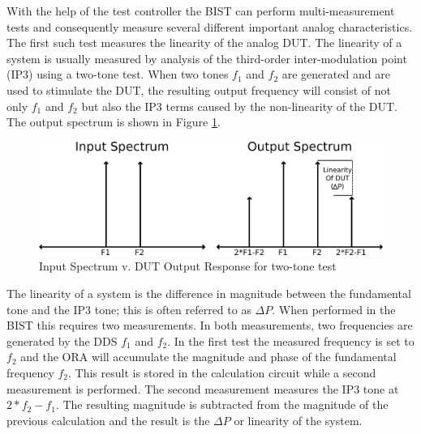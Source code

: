 \documentclass[12pt]{report}
\begin{document}
With the help of the test controller the BIST can perform multi-measurement tests and consequently measure several different important analog characteristics. The first such test measures the linearity of the analog DUT.  The linearity of a system is usually measured by analysis of the third-order inter-modulation point (IP3) using a two-tone test\cite{stroud-automaticlinearity}.  When two tones $f_1$ and $f_2$ are generated and are used to stimulate the DUT, the resulting output frequency will consist of not only $f_1$ and $f_2$ but also the IP3 terms caused by the non-linearity of the DUT.  The output spectrum is shown in Figure \ref{fig:linearityspectrum}.  
\begin{figure}
  \begin{center}
    \includegraphics[scale=1]{images/linearity-spectrum}
  \end{center}
  \caption{Input Spectrum v. DUT Output Response for two-tone test}
  \label{fig:linearityspectrum}
\end{figure}
The linearity of a system is the difference in magnitude between the fundamental tone and the IP3 tone; this is often referred to as $\Delta P$\cite{stroud-automaticlinearity}.  When performed in the BIST this requires two measurements.  In both measurements, two frequencies are generated by the DDS $f_1$ and $f_2$.  In the first test the measured frequency is set to $f_2$ and the ORA will accumulate the magnitude and phase of the fundamental frequency $f_2$.  This result is stored in the calculation circuit while a second measurement is performed.  The second measurement measures the IP3 tone at $2*f_2-f_1$\cite{testtime}\cite{jie}.  The resulting magnitude is subtracted from the magnitude of the previous calculation and the result is the $\Delta P$ or linearity of the system.
\end{document}
